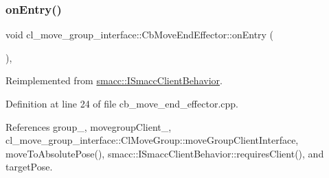 \subsubsection{\texorpdfstring{on\+Entry()}{onEntry()}}
{\footnotesize\ttfamily void cl\+\_\+move\+\_\+group\+\_\+interface\+::\+Cb\+Move\+End\+Effector\+::on\+Entry (\begin{DoxyParamCaption}{ }\end{DoxyParamCaption})\hspace{0.3cm}{\ttfamily [override]}, {\ttfamily [virtual]}}



Reimplemented from \hyperlink{classsmacc_1_1ISmaccClientBehavior_a3ec24a839087c550e1d62a81e48cf530}{smacc\+::\+I\+Smacc\+Client\+Behavior}.



Definition at line 24 of file cb\+\_\+move\+\_\+end\+\_\+effector.\+cpp.



References group\+\_\+, movegroup\+Client\+\_\+, cl\+\_\+move\+\_\+group\+\_\+interface\+::\+Cl\+Move\+Group\+::move\+Group\+Client\+Interface, move\+To\+Absolute\+Pose(), smacc\+::\+I\+Smacc\+Client\+Behavior\+::requires\+Client(), and target\+Pose.


